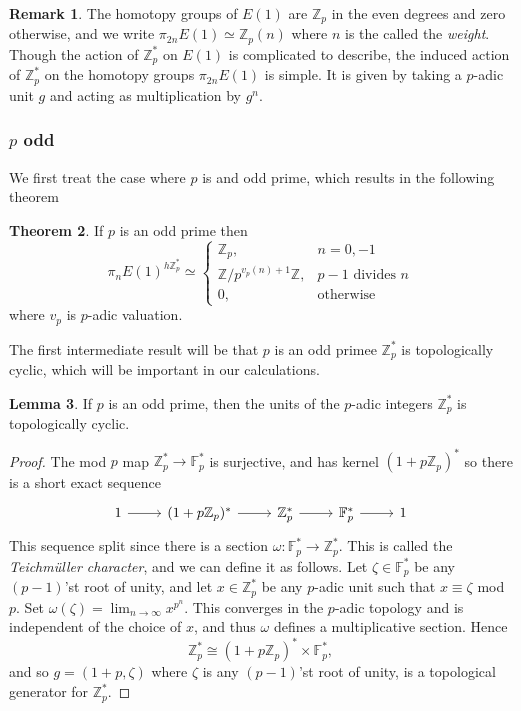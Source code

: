 \documentclass[a4paper]{article} %
\theoremstyle{definition}
\newtheorem{theorem}{Theorem} %
\newtheorem{lemma}[theorem]{Lemma}
\newtheorem{remark}[theorem]{Remark}
\newcommand{\Z}{\mathbb{Z}}
\newcommand{\F}{\mathbb{F}}
\begin{document}
\begin{remark}
  The homotopy groups of $E(1)$ are $\Z_p$ in the even degrees and zero otherwise, and we write $\pi_{2n}E(1) \simeq \Z_p(n)$ where $n$ is the called the \textit{weight}. Though the action of $\Z_p^*$ on $E(1)$ is complicated to describe, the induced action of $\Z_p^*$ on the homotopy groups $\pi_{2n}E(1)$ is simple. It is given by taking a $p$-adic unit $g$ and acting as multiplication by $g^n$.
\end{remark}

\subsubsection{$p$ odd}

We first treat the case where $p$ is and odd prime, which results in the following theorem
\begin{theorem}
 If $p$ is an odd prime then
 \[
  \pi_n E(1)^{h\Z_p^*} \simeq
    \begin{cases}
    \Z_p, & n=0,-1 \\
    \Z/p^{v_p(n)+1}\Z, & p-1 \text{ divides } n \\
    0, & \text{otherwise}
    \end{cases}
  \]
  where $v_p$ is $p$-adic valuation.
\end{theorem}
The first intermediate result will be that $p$ is an odd primee $\Z_p^*$ is topologically cyclic, which will be important in our calculations.
\begin{lemma}
  If $p$ is an odd prime, then the units of the $p$-adic integers $\Z_p^*$ is topologically cyclic.
\end{lemma}
\begin{proof}
The mod $p$ map $\Z_p^* \to \F_p^*$ is surjective, and has kernel $(1+p\Z_p)^*$ so there is a short exact sequence
\[
\begin{tikzcd}
1 \rar & (1+p\Z_p)^* \rar{} & \Z_p^* \rar{} & \F_p^* \rar & 1
\end{tikzcd}
\]
This sequence split since there is a section $\omega \colon \F_p^* \to \Z_p^*$. This is called the \textit{Teichmüller character}, and we can define it as follows. Let $\zeta \in \F_p^*$ be any $(p-1)$'st root of unity, and let $x \in \Z_p^*$ be any $p$-adic unit such that $x \equiv \zeta$ mod $p$. Set $\omega(\zeta) = \lim_{n \to \infty} x^{p^n}$. This converges in the $p$-adic topology and is independent of the choice of $x$,
and thus $\omega$ defines a multiplicative section. Hence
\[
\Z_p^* \cong (1 + p\Z_p)^* \times \F_p^*,
\]
and so $g = (1+p, \zeta)$ where $\zeta$ is any $(p-1)$'st root of unity, is a topological generator for $\Z_p^*$.
\end{proof}
\end{document}
